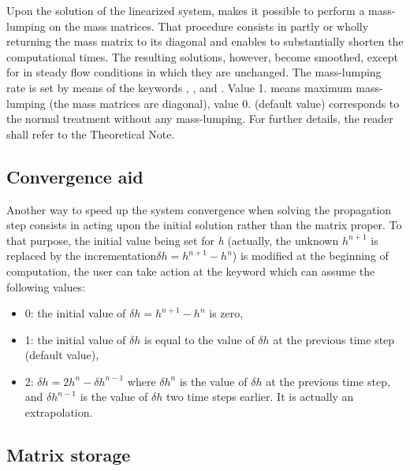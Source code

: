 Upon the solution of the linearized system,  makes it possible to
perform a mass-lumping on the mass matrices. That procedure consists in partly
or wholly returning the mass matrix to its diagonal and enables to
substantially shorten the computational times. The resulting solutions,
however, become smoothed, except for in steady flow conditions in which they
are unchanged. The mass-lumping rate is set by means of the keywords
, ,
 and . Value 1. means maximum mass-lumping (the mass matrices are
diagonal), value 0. (default value) corresponds to the normal treatment without
any mass-lumping. For further details, the reader shall refer to the 
Theoretical Note.

\subsection{Convergence aid}

Another way to speed up the system convergence when solving the propagation
step consists in acting upon the initial solution rather than the matrix
proper. To that purpose, the initial value being set for \textit{h} (actually,
the unknown $h^{n+1}$ is replaced by the incrementation$\delta h=h^{n+1} -h^{n}
$) is modified at the beginning of computation, the user can take action at the
keyword  which can assume the following values:

\begin{itemize}
\item 0: the initial value of $\delta h=h^{n+1} -h^{n} $ is zero,

\item 1: the initial value of $\delta h$ is equal to the value of $\delta h$
at the previous time step (default value),

\item 2: $\delta h=2h^{n} -\delta h^{n-1} $ where $\delta h^{n} $ is the value
of $\delta h$ at the previous time step, and $\delta h^{n-1} $ is the value of
$\delta h$ two time steps earlier. It is actually an extrapolation.
\end{itemize}


\subsection{Matrix storage}

